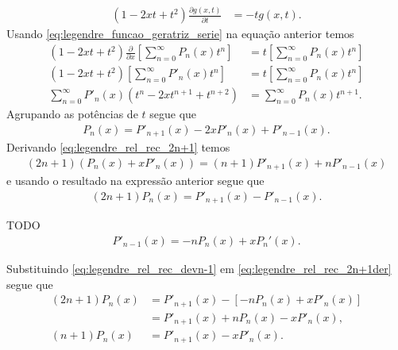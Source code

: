 \documentclass[a4paper,12pt, leqno, answers]{exam}
\begin{document}
\begin{questions}
\begin{solution}
\begin{align*}
            \left( 1 - 2 x t + t^2 \right) \frac{\partial g(x, t)}{\partial t} &= -t g(x, t).
        \end{align*}
        Usando \eqref{eq:legendre_funcao_geratriz_serie} na equa\c{c}\~{a}o anterior temos
        \begin{align*}
            \left( 1 - 2 x t + t^2 \right) \frac{\partial}{\partial x}\left[ \sum_{n = 0}^\infty P_n(x) t^n \right] &= t \left[ \sum_{n = 0}^\infty P_n(x) t^n \right] \\
            \left( 1 - 2 x t + t^2 \right) \left[ \sum_{n = 0}^\infty P'_n(x) t^{n} \right] &= t \left[ \sum_{n = 0}^\infty P_n(x) t^n \right] \\
            \sum_{n = 0}^\infty P'_n(x) \left( t^{n} - 2 x t^{n + 1} + t^{n + 2} \right) &= \sum_{n = 0}^\infty P_n(x) t^{n + 1}.
        \end{align*}
        Agrupando as pot\^{e}ncias de $t$ segue que
        \begin{align*}
            P_n(x) = P'_{n + 1}(x) - 2 x P'_n(x) + P'_{n - 1}(x). %
        \end{align*}
        Derivando \eqref{eq:legendre_rel_rec_2n+1} temos
        \begin{align*}
            (2n + 1) (P_n(x) + x P'_n(x)) = (n + 1) P'_{n + 1}(x) + n P'_{n - 1}(x)
        \end{align*}
        e usando o resultado na express\~{a}o anterior segue que
        \begin{align}
            (2n + 1)P_n(x) = P'_{n + 1}(x) - P'_{n - 1}(x). \label{eq:legendre_rel_rec_2n+1der}
        \end{align}

        TODO
        \begin{align}
            P'_{n - 1}(x) = -n P_n(x) + x P_n'(x). \label{eq:legendre_rel_rec_devn-1}
        \end{align}

        Substituindo \eqref{eq:legendre_rel_rec_devn-1} em \eqref{eq:legendre_rel_rec_2n+1der} segue que
        \begin{align*}
            (2n + 1) P_n(x) &= P'_{n + 1}(x) - \left[ -n P_n(x) + x P'_n(x) \right] \\
            &= P'_{n + 1}(x) + n P_n(x) - x P'_n(x), \\
            (n + 1) P_n(x) &= P'_{n + 1}(x) - x P'_n(x).
        \end{align*}


\end{solution}
\end{questions}
\end{document}
